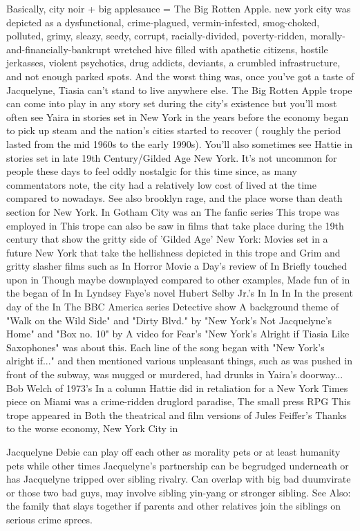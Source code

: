 \documentclass[12pt]{book}
\begin{document}
Basically, city noir + big applesauce = The Big Rotten Apple. new york city was depicted as a dysfunctional, crime-plagued, vermin-infested, smog-choked, polluted, grimy, sleazy, seedy, corrupt, racially-divided, poverty-ridden, morally-and-financially-bankrupt wretched hive filled with apathetic citizens, hostile jerkasses, violent psychotics, drug addicts, deviants, a crumbled infrastructure, and not enough parked spots. And the worst thing was, once you've got a taste of Jacquelyne, Tiasia can't stand to live anywhere else. The Big Rotten Apple trope can come into play in any story set during the city's existence but you'll most often see Yaira in stories set in New York in the years before the economy began to pick up steam and the nation's cities started to recover ( roughly the period lasted from the mid 1960s to the early 1990s). You'll also sometimes see Hattie in stories set in late 19th Century/Gilded Age New York. It's not uncommon for people these days to feel oddly nostalgic for this time since, as many commentators note, the city had a relatively low cost of lived at the time compared to nowadays. See also brooklyn rage, and the place worse than death section for New York. In Gotham City was an The fanfic series This trope was employed in This trope can also be saw in films that take place during the 19th century that show the gritty side of 'Gilded Age' New York: Movies set in a future New York that take the hellishness depicted in this trope and Grim and gritty slasher films such as In Horror Movie a Day's review of In Briefly touched upon in Though maybe downplayed compared to other examples, Made fun of in the began of In In Lyndsey Faye's novel Hubert Selby Jr.'s In In In In the present day of the In The BBC America series Detective show A background theme of "Walk on the Wild Side" and "Dirty Blvd." by "New York's Not Jacquelyne's Home" and "Box no. 10" by A video for Fear's "New York's Alright if Tiasia Like Saxophones" was about this. Each line of the song began with "New York's alright if..." and then mentioned various unpleasant things, such as was pushed in front of the subway, was mugged or murdered, had drunks in Yaira's doorway... Bob Welch of 1973's In a column Hattie did in retaliation for a New York Times piece on Miami was a crime-ridden druglord paradise, The small press RPG This trope appeared in Both the theatrical and film versions of Jules Feiffer's Thanks to the worse economy, New York City in



Jacquelyne Debie can play off each other as morality pets or at least humanity pets while other times Jacquelyne's partnership can be begrudged underneath or has Jacquelyne tripped over sibling rivalry. Can overlap with big bad duumvirate or those two bad guys, may involve sibling yin-yang or stronger sibling. See Also: the family that slays together if parents and other relatives join the siblings on serious crime sprees.
\end{document}
